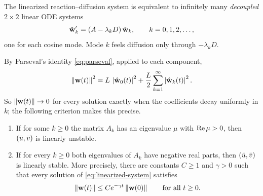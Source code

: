 \begin{keyidea}
The linearized reaction--diffusion system is equivalent to infinitely many
\emph{decoupled} $2\times2$ linear ODE systems
\begin{equation*}
  \hat{\mathbf{w}}_k' = (A-\lambda_kD)\,\hat{\mathbf{w}}_k,\qquad k=0,1,2,\dots,
\end{equation*}
one for each cosine mode. Mode $k$ feels diffusion only through $-\lambda_kD$.
\end{keyidea}

By Parseval's identity \eqref{eq:parseval}, applied to each component,
\begin{equation}\label{eq:turing-parseval}
  \left\lVert \mathbf{w}(t)\right\rVert^2 = L\,\left\lvert \hat{\mathbf{w}}_0(t)\right\rvert^2 + \frac L2\sum_{k=1}^\infty \left\lvert \hat{\mathbf{w}}_k(t)\right\rvert^2 .
\end{equation}
So $\left\lVert \mathbf{w}(t)\right\rVert\to0$ for every solution exactly when the coefficients decay
uniformly in $k$; the following criterion makes this precise.

\begin{theorem}\label{thm:spectral-criterion}
\leavevmode
\begin{enumerate}[label=(\roman*)]
  \item If for some $k\ge0$ the matrix $A_k$ has an eigenvalue $\mu$ with
        $\operatorname{Re}\mu>0$, then $(\bar u,\bar v)$ is linearly unstable.
  \item If for every $k\ge0$ both eigenvalues of $A_k$ have negative real parts,
        then $(\bar u,\bar v)$ is linearly stable. More precisely, there are constants
        $C\ge1$ and $\gamma>0$ such that every solution of
        \eqref{eq:linearized-system} satisfies
        \begin{equation*}
          \left\lVert \mathbf{w}(t)\right\rVert\le C e^{-\gamma t}\left\lVert \mathbf{w}(0)\right\rVert\qquad\text{for all } t\ge0 .
        \end{equation*}
\end{enumerate}
\end{theorem}

